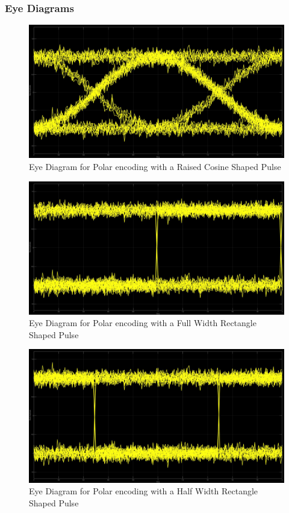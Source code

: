 \documentclass{article}
\begin{document}
\subsubsection{Eye Diagrams}
\begin{figure}[H]
  \includegraphics[width = \linewidth]{Polar_Raised_Eye.jpg}
  \caption{Eye Diagram for Polar encoding with a Raised Cosine Shaped Pulse}
  \label{fig:Polar-Raised-Eye}
\end{figure}
\begin{figure}[H]
  \includegraphics[width = \linewidth]{Polar_Rect_F_Eye.jpg}
  \caption{Eye Diagram for Polar encoding with a Full Width Rectangle Shaped Pulse}
  \label{fig:Polar-Rect-F-Eye}
\end{figure}
\begin{figure}[H]
  \includegraphics[width = \linewidth]{Polar_Rect_H_Eye.jpg}
  \caption{Eye Diagram for Polar encoding with a Half Width Rectangle Shaped Pulse}
  \label{fig:Polar-Rect-H-Eye}
\end{figure}
\end{document}
